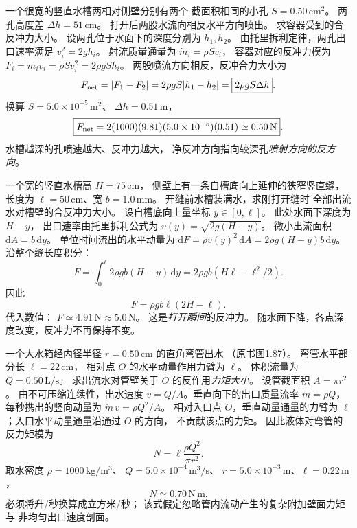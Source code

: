 一个很宽的竖直水槽两相对侧壁分别有两个
截面积相同的小孔 $S=0.50\,\mathrm{cm^2}$。
两孔高度差 $\Delta h=51\,\mathrm{cm}$。
打开后两股水流向相反水平方向喷出。
求容器受到的合反冲力大小。
\exsolution
设两孔位于水面下的深度分别为 $h_1,h_2$。
由托里拆利定律，两孔出口速率满足
$v_i^2=2gh_i$。
射流质量通量为
$\dot m_i=\rho S v_i$，
容器对应的反冲力模为
$F_i=\dot m_i v_i=\rho S v_i^2
=2\rho g S h_i$。
两股喷流方向相反，反冲合力大小为
\[
F_{\rm net}=|F_1-F_2|
=2\rho gS|h_1-h_2|
=\boxed{2\rho gS\Delta h}.
\]
换算 $S=5.0\times10^{-5}\,\mathrm{m^2}$、
$\Delta h=0.51\,\mathrm m$，
\[
\boxed{F_{\rm net}
=2(1000)(9.81)(5.0\times10^{-5})(0.51)
\simeq0.50\,\mathrm N}.
\]
\excheck 水槽越深的孔喷速越大、反冲力越大，
净反冲方向指向较深孔\emph{喷射方向的反方向}。

一个宽的竖直水槽高 $H=75\,\mathrm{cm}$，
侧壁上有一条自槽底向上延伸的狭窄竖直缝，
长度为 $\ell=50\,\mathrm{cm}$、宽
$b=1.0\,\mathrm{mm}$。
开缝前水槽装满水，求刚打开缝时
全部出流水对槽壁的合反冲力大小。
\exsolution
设自槽底向上量坐标 $y\in[0,\ell]$。
此处水面下深度为 $H-y$，
出口速率由托里拆利公式为
$v(y)=\sqrt{2g(H-y)}$。
微小出流面积 $\mathrm dA=b\,\mathrm dy$。
单位时间流出的水平动量为
$\mathrm dF=\rho v(y)^2\,\mathrm dA
=2\rho g(H-y)b\,\mathrm dy$。
沿整个缝长度积分：
\[
F=\int_0^\ell2\rho gb(H-y)\,\mathrm dy
=2\rho gb(H\ell-\ell^2/2).
\]
因此
\[
\boxed{F=\rho gb\ell(2H-\ell)}.
\]
代入数值：
$\boxed{F\simeq4.91\,\mathrm N\approx5.0\,\mathrm N}$。
\excheck 这是\emph{打开瞬间}的反冲力。
随水面下降，各点深度改变，反冲力不再保持不变。

一个大水箱经内径半径
$r=0.50\,\mathrm{cm}$ 的直角弯管出水
（原书图1.87）。
弯管水平部分长 $\ell=22\,\mathrm{cm}$，
相对点 $O$ 的水平动量作用力臂为 $\ell$。
体积流量为 $Q=0.50\,\mathrm{L/s}$。
求出流水对管壁关于 $O$ 的反作用\emph{力矩大小}。
\exsolution
设管截面积 $A=\pi r^2$。
由不可压缩连续性，出水速度
$v=Q/A$。垂直向下的出口质量流率
$\dot m=\rho Q$，每秒携出的竖向动量为
$\dot m\,v=\rho Q^2/A$。
相对入口点 $O$，垂直动量通量的力臂为
$\ell$；入口水平动量通量沿通过 $O$ 的方向，
不贡献该点的力矩。
因此液体对弯管的反力矩模为
\[
\boxed{N=\ell\frac{\rho Q^2}{\pi r^2}}.
\]
取水密度 $\rho=1000\,\mathrm{kg/m^3}$、
$Q=5.0\times10^{-4}\,\mathrm{m^3/s}$、
$r=5.0\times10^{-3}\,\mathrm m$、$\ell=0.22\,\mathrm m$，
\[
\boxed{N\simeq0.70\,\mathrm{N\,m}}.
\]
\excheck 必须将升/秒换算成立方米/秒；
该式假定忽略管内流动产生的复杂附加壁面力矩与
非均匀出口速度剖面。

